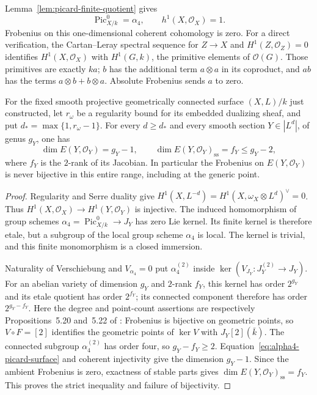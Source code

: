 Lemma~\ref{lem:picard-finite-quotient} gives
\begin{equation}\label{eq:alpha4-picard-surface}
 \operatorname{Pic}_{X/k}^0=\alpha_4,\qquad
 h^1(X,\mathcal O_X)=1.
\end{equation}
Frobenius on this one-dimensional coherent cohomology is zero.
For a direct verification, the Cartan--Leray spectral sequence for
$Z\to X$ and $H^1(Z,\mathcal O_Z)=0$ identifies
$H^1(X,\mathcal O_X)$ with $H^1(G,k)$, the primitive elements of
$\mathcal O(G)$.  Those primitives are exactly $k a$; $b$ has the
additional term $a\otimes a$ in its coproduct, and $ab$ has the
terms $a\otimes b+b\otimes a$.  Absolute Frobenius sends $a$ to zero.

\begin{theorem}\label{thm:relative-ordinarity-fails-smooth}
For the fixed smooth projective geometrically connected surface
$(X,L)/k$ just constructed, let $r_\omega$ be a regularity bound for
its embedded dualizing sheaf, and put
$d_* =\max\{1,r_\omega-1\}$.
For every $d\geq d_*$ and every smooth section $Y\in|L^d|$, of
genus $g_Y$, one has
\[
 \dim E(Y,\mathcal O_Y)=g_Y-1,
 \qquad
 \dim E(Y,\mathcal O_Y)_{\mathrm{ss}}
       =f_Y\leq g_Y-2,
\]
where $f_Y$ is the $2$-rank of its Jacobian.  In particular the
Frobenius on $E(Y,\mathcal O_Y)$ is never bijective in this entire
range, including at the generic point.
\end{theorem}

\begin{proof}
Regularity and Serre duality give
$H^1(X,L^{-d})=H^1(X,\omega_X\otimes L^d)^\vee=0$.
Thus $H^1(X,\mathcal O_X)\to H^1(Y,\mathcal O_Y)$ is injective.
The induced homomorphism of group schemes
$\alpha_4=\operatorname{Pic}_{X/k}^0\to J_Y$ has zero Lie kernel.
Its finite kernel is therefore etale, but a subgroup of the local
group scheme $\alpha_4$ is local.  The kernel is trivial, and this
finite monomorphism is a closed immersion.

Naturality of Verschiebung and $V_{\alpha_4}=0$ put
$\alpha_4^{(2)}$ inside $\ker(V_{J_Y}:J_Y^{(2)}\to J_Y)$.
For an abelian variety of dimension $g_Y$ and $2$-rank $f_Y$, this
kernel has order $2^{g_Y}$ and its etale quotient has order $2^{f_Y}$;
its connected component therefore has order $2^{g_Y-f_Y}$.
Here the degree and point-count assertions are respectively
Propositions~5.20 and~5.22 of
\cite{EdixhovenVanDerGeerMoonenAV}: Frobenius is bijective on geometric
points, so $V\circ F=[2]$ identifies the geometric points of $\ker V$
with $J_Y[2](\bar k)$.
The connected subgroup $\alpha_4^{(2)}$ has order four, so
$g_Y-f_Y\geq2$.
Equation~\eqref{eq:alpha4-picard-surface} and coherent injectivity
give the dimension $g_Y-1$.  Since the ambient Frobenius is zero,
exactness of stable parts gives
$\dim E(Y,\mathcal O_Y)_{\mathrm{ss}}=f_Y$.
This proves the strict inequality and failure of bijectivity.
\end{proof}

